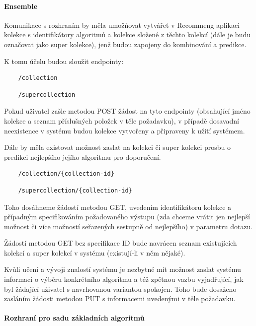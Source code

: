 \documentclass[thesis=M,czech]{FITthesis}[2014/05/07]
\begin{document}
\paragraph{Ensemble}
Komunikace s rozhraním by měla umožňovat vytvářet v Recommeng aplikaci kolekce s identifikátory algoritmů a kolekce složené z těchto kolekcí (dále je budu označovat jako super kolekce), jenž budou zapojeny do kombinování a predikce. 

K tomu účelu budou sloužit endpointy:

\begin{verbatim}
	/collection
\end{verbatim}

\begin{verbatim}
	/supercollection
\end{verbatim}

Pokud uživatel zašle metodou POST žádost na tyto endpointy (obsahující jméno kolekce a seznam příslušných položek v těle požadavku), v případě dosavadní neexistence v systému budou kolekce vytvořeny a připraveny k užití systémem.

Dále by měla existovat možnost zaslat na kolekci či super kolekci prosbu o predikci nejlepšího jejího algoritmu pro doporučení.

\begin{verbatim}
	/collection/{collection-id}
\end{verbatim}

\begin{verbatim}
	/supercollection/{collection-id}
\end{verbatim}

Toho dosáhneme žádostí metodou GET, uvedením identifikátoru kolekce a případným specifikováním požadovaného výstupu (zda chceme vrátit jen nejlepší možnost či více možností seřazených sestupně od nejlepšího) v parametru dotazu.

Žádostí metodou GET bez specifikace ID bude navrácen seznam existujících kolekcí a super kolekcí v systému (existují-li v něm nějaké).

Kvůli učení a vývoji znalostí systému je nezbytné mít možnost zaslat systému informaci o výběru konkrétního algoritmu a též zpětnou vazbu vyjadřující, jak byl žádající uživatel s navrhovanou variantou spokojen. Toho bude dosaženo zasláním žádosti metodou PUT s informacemi uvedenými v těle požadavku.

\paragraph{Rozhraní pro sadu základních algoritmů}
\end{document}

